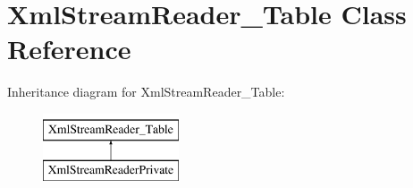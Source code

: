 \hypertarget{class_xml_stream_reader___table}{}\section{Xml\+Stream\+Reader\+\_\+\+Table Class Reference}
\label{class_xml_stream_reader___table}
Inheritance diagram for Xml\+Stream\+Reader\+\_\+\+Table\+:\begin{figure}[H]
\begin{center}
\leavevmode
\includegraphics[height=2.000000cm]{class_xml_stream_reader___table}
\end{center}
\end{figure}
